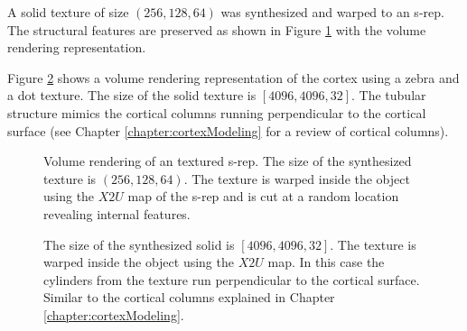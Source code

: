 A solid texture of size $(256, 128, 64)$ was synthesized
and warped to an s-rep.
The structural features are preserved
as shown in Figure \ref{fig:volumeRenderingS-repsText}
with the volume rendering representation. 

Figure \ref{fig:volumeRenderingCortex} shows a volume rendering representation of the cortex using a zebra and a dot texture. 
The size of the solid texture is $[4096, 4096, 32]$. The tubular structure mimics the cortical columns running perpendicular 
to the cortical surface (see Chapter \ref{chapter:cortexModeling} for a review of cortical columns). 

\begin{figure} 
 \centering   
 \caption[S-rep textured with spheres and striated cardiac tissue.]{Volume rendering of an textured s-rep. The size of the synthesized texture is $(256, 128, 64)$. 
								     The texture is warped inside the object using the $X2U$ map of the s-rep and 
							             is cut at a random location revealing internal features.}
 \label{fig:volumeRenderingS-repsText}  
\end{figure}

\begin{figure} 
 \centering   
 \caption[S-rep of the cortex with zebra texture.]{The size of the synthesized solid is $[4096, 4096, 32]$. The texture is warped inside the object using the $X2U$ map. In this case
						    the cylinders from the texture run perpendicular to the cortical surface. Similar to the cortical columns explained in Chapter \ref{chapter:cortexModeling}.}
 \label{fig:volumeRenderingCortex}  
\end{figure}

